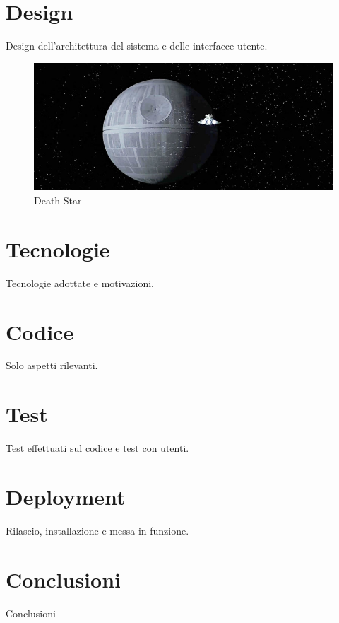 \documentclass[12pt,a4paper,openright,twoside]{book}
\begin{document}
\chapter{Design}
Design dell'architettura del sistema e delle interfacce utente.

\begin{figure}[h!]
\centering
\includegraphics[scale=0.44]{deathStar2.jpg}
\caption{Death Star}
\label{fig:deathstar}
\end{figure}

\chapter{Tecnologie}
Tecnologie adottate e motivazioni.

\chapter{Codice}
Solo aspetti rilevanti.

\chapter{Test}
Test effettuati sul codice e test con utenti.

\chapter{Deployment}
Rilascio, installazione e messa in funzione.


\chapter{Conclusioni}
Conclusioni



\end{document}
